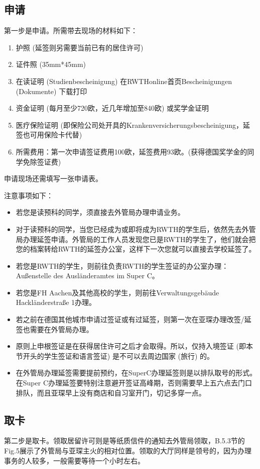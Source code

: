   \subsection{申请}\label{subsec:申请}

  第一步是申请。所需带去现场的材料如下：
  \begin{enumerate}
    \item 护照 (延签则另需要当前已有的居住许可)
    \item 证件照 (35mm*45mm)
    \item 在读证明 (Studienbescheinigung) 在RWTHonline首页Bescheinigungen (Dokumente) 下载打印
    \item 资金证明 (每月至少720欧，近几年增加至840欧) 或奖学金证明
    \item 医疗保险证明 (即保险公司处开具的Krankenversicherungsbescheinigung，延签也可用保险卡代替)
    \item 所需费用：第一次申请签证费用100欧，延签费用93欧。(获得德国奖学金的同学免除签证费)
  \end{enumerate}

  申请现场还需填写一张申请表。

  注意事项如下：

  \begin{itemize}
    \item 若您是读预科的同学，须直接去外管局办理申请业务。
    \item 对于读预科的同学，当您已经成为或即将成为RWTH的学生后，依然先去外管局办理延签申请。外管局的工作人员发现您已是RWTH的学生了，他们就会把您的档案转给RWTH的延签办公室，这样下一次您就可以直接去学校延签了。
    \item 若您是RWTH的学生，则前往负责RWTH的学生签证的办公室办理：Außenstelle des Ausländeramtes im Super C。
    \item 若您是FH Aachen及其他高校的学生，则前往Verwaltungsgebäude Hackländerstraße 1办理。
    \item 若之前在德国其他城市申请过签证或有过延签，则第一次在亚琛办理改签/延签也需要在外管局办理。
    \item 原则上申根签证是在获得居住许可之后才会取得。所以，仅持入境签证 (即本节开头的学生签证和语言签证) 是不可以去周边国家 (旅行) 的。
    \item 在外管局办理延签需要提前预约，在SuperC办理延签则是以排队取号的形式。在Super C办理延签要特别注意避开签证高峰期，否则需要早上五六点去门口排队，而且亚琛早上没有商店和自习室开门，切记多穿一点。
  \end{itemize}

  \subsection{取卡}\label{subsec:取卡}

  第二步是取卡。领取居留许可则是等纸质信件的通知去外管局领取，B.5.3节的Fig.5展示了外管局与亚琛主火的相对位置。领取的大厅同样是领号的，因为办理事务的人较多，一般需要等待一个小时左右。
